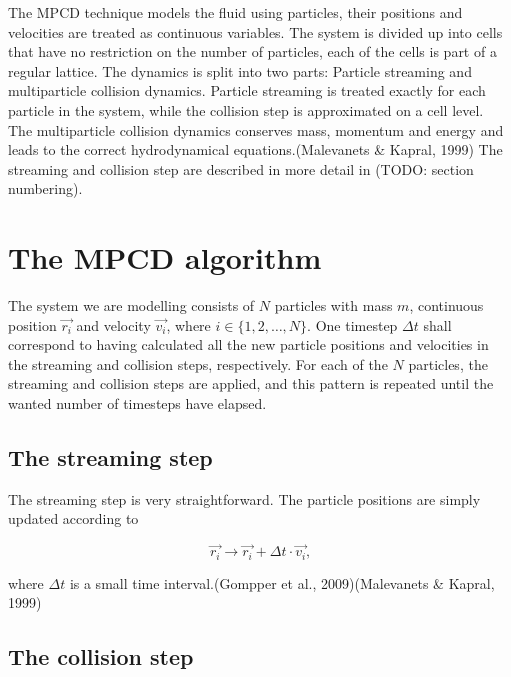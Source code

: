 \documentclass[
]{article}
\begin{document}
The MPCD technique models the fluid using particles, their positions and
velocities are treated as continuous variables. The system is divided up
into cells that have no restriction on the number of particles, each of
the cells is part of a regular lattice. The dynamics is split into two
parts: Particle streaming and multiparticle collision dynamics. Particle
streaming is treated exactly for each particle in the system, while the
collision step is approximated on a cell level. The multiparticle
collision dynamics conserves mass, momentum and energy and leads to the
correct hydrodynamical equations.(Malevanets \& Kapral, 1999) The
streaming and collision step are described in more detail in (TODO:
section numbering).

\hypertarget{the-mpcd-algorithm}{%
\section{The MPCD algorithm}\label{the-mpcd-algorithm}}

The system we are modelling consists of \(N\) particles with mass \(m\),
continuous position \(\vec{r_{i}}\) and velocity \(\vec{v_{i}}\), where
\(i \in \{1, 2, \dots, N\}\). One timestep \(\Delta t\) shall correspond
to having calculated all the new particle positions and velocities in
the streaming and collision steps, respectively. For each of the \(N\)
particles, the streaming and collision steps are applied, and this
pattern is repeated until the wanted number of timesteps have elapsed.

\hypertarget{the-streaming-step}{%
\subsection{The streaming step}\label{the-streaming-step}}

The streaming step is very straightforward. The particle positions are
simply updated according to

\begin{equation}
\vec{r_{i}} \rightarrow \vec{r_{i}} + \Delta t \cdot \vec{v_{i}}\textrm{,}
\end{equation}

where \(\Delta t\) is a small time interval.(Gompper et al.,
2009)(Malevanets \& Kapral, 1999)

\hypertarget{the-collision-step}{%
\subsection{The collision step}\label{the-collision-step}}
\end{document}
